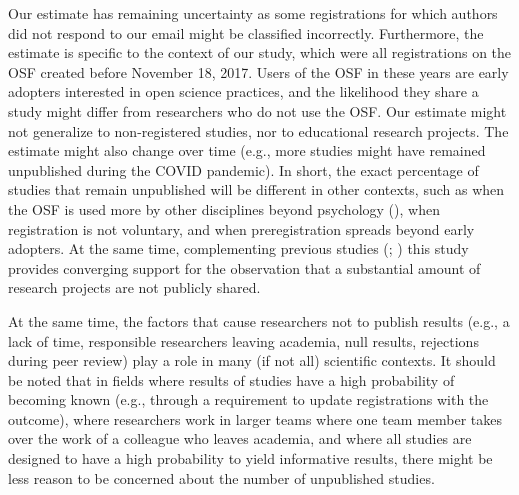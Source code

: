 \documentclass[
  ,man, a4paper,floatsintext]{apa6}
\begin{document}
Our estimate has remaining uncertainty as some registrations for which authors did not respond to our email might be classified incorrectly. Furthermore, the estimate is specific to the context of our study, which were all registrations on the OSF created before November 18, 2017. Users of the OSF in these years are early adopters interested in open science practices, and the likelihood they share a study might differ from researchers who do not use the OSF. Our estimate might not generalize to non-registered studies, nor to educational research projects. The estimate might also change over time (e.g., more studies might have remained unpublished during the COVID pandemic). In short, the exact percentage of studies that remain unpublished will be different in other contexts, such as when the OSF is used more by other disciplines beyond psychology (), when registration is not voluntary, and when preregistration spreads beyond early adopters. At the same time, complementing previous studies (; ) this study provides converging support for the observation that a substantial amount of research projects are not publicly shared.

At the same time, the factors that cause researchers not to publish results (e.g., a lack of time, responsible researchers leaving academia, null results, rejections during peer review) play a role in many (if not all) scientific contexts. It should be noted that in fields where results of studies have a high probability of becoming known (e.g., through a requirement to update registrations with the outcome), where researchers work in larger teams where one team member takes over the work of a colleague who leaves academia, and where all studies are designed to have a high probability to yield informative results, there might be less reason to be concerned about the number of unpublished studies.
\end{document}
